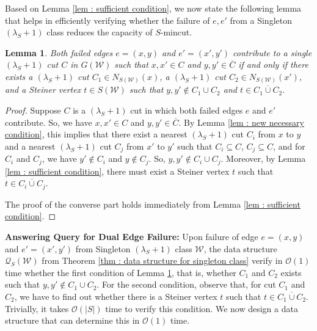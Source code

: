 \documentclass[letterpaper,11pt]{article}
\newtheorem{lemma}{Lemma}[]
\begin{document}
Based on Lemma \ref{lem : sufficient condition}, we now state the following lemma that helps in efficiently verifying whether the failure of $e,e'$ from a Singleton $(\lambda_S+1)$ class reduces the capacity of $S$-mincut. 
\begin{lemma} \label{lem : condition of dual failure}
    Both failed edges $e=(x,y)$ and $e'=(x',y')$ contribute to a single $(\lambda_S+1)$ cut $C$ in $G({\mathcal W})$ such that $x,x'\in C$ and $y,y'\in \overline{C}$ if and only if there exists a $(\lambda_S+1)$ cut $C_1\in N_{S({\mathcal W})}(x)$, a $(\lambda_S+1)$ cut $C_2\in N_{S({\mathcal W})}(x')$, and a Steiner vertex $t\in S({\mathcal W})$ such that $y,y'\notin C_1 \cup C_2$ and $t\in \overline{C_1 \cup C_2}$.
\end{lemma}
\begin{proof}
    Suppose $C$ is a $(\lambda_S+1)$ cut in which both failed edges $e$ and $e'$ contribute. So, we have $x,x'\in C$ and $y,y'\in \overline{C}$. By Lemma \ref{lem : new necessary condition}, this implies that there exist a nearest $(\lambda_S+1)$ cut $C_i$ from $x$ to $y$ and a nearest $(\lambda_S+1)$ cut $C_j$ from $x'$ to $y'$ such that $C_i\subseteq C$, $C_j\subseteq C$, and for $C_i$ and $C_j$, we have $y'\notin C_i$ and $y\notin C_j$. So, $y,y'\notin C_i\cup C_j$. Moreover, by Lemma \ref{lem : sufficient condition}, there must exist a Steiner vertex $t$ such that $t\in \overline{C_i \cup C_j}$. 

    The proof of the converse part holds immediately from Lemma \ref{lem : sufficient condition}.
\end{proof}








\noindent
\textbf{Answering Query for Dual Edge Failure:}
Upon failure of edge $e=(x,y)$ and $e'=(x',y')$ from  Singleton $(\lambda_S+1)$ class ${\mathcal W}$, the data structure ${\mathcal Q}_S({\mathcal W})$ from Theorem \ref{thm : data structure for singleton class} verify in ${\mathcal O}(1)$ time whether the first condition of Lemma \ref{lem : condition of dual failure}, that is, whether $C_1$ and $C_2$ exists such that $y,y'\notin C_1\cup C_2$. For the second condition, observe that, for cut $C_1$ and $C_2$, we have to find out whether there is a Steiner vertex $t$ such that $t\in \overline{C_1 \cup C_2}$. Trivially, it takes ${\mathcal O}(|S|)$ time to verify this condition. We now design a data structure that can determine this in ${\mathcal O}(1)$ time. 
\end{document}

